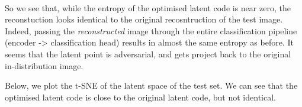 \documentclass[11pt]{article}
\begin{document}
    \begin{center}
    \end{center}
    { \hspace*{\fill} \\}
    
    So we see that, while the entropy of the optimised latent code is near
zero, the reconstuction looks identical to the original recosntruction
of the test image. Indeed, passing the \emph{reconstructed} image
through the entire classification pipeline (encoder -\textgreater{}
classification head) results in almost the same entropy as before. It
seems that the latent point is adversarial, and gets project back to the
original in-distribution image.

Below, we plot the t-SNE of the latent space of the test set. We can see
that the optimised latent code is close to the original latent code, but
not identical.
\end{document}
